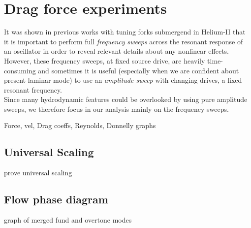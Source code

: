 \section{Drag force experiments}

It was shown in previous works \cite{svoc2016} \cite{fork-exp}  with tuning forks submergend in Helium-II that it is important to perform full \textit{frequency sweeps} across the resonant response of an oscillator in order to reveal relevant details about any nonlinear effects.\\
However, these frequency sweeps, at fixed source drive, are heavily time-consuming and sometimes it is useful (especially when we are confident about present laminar mode) to use an \textit{amplitude sweep} with changing drives, a fixed resonant frequency.\\
Since many hydrodynamic features could be overlooked by using pure amplitude sweeps, we therefore focus in our analysis mainly on the frequency sweeps.

\todo Force, vel, Drag coeffs, Reynolds, Donnelly graphs

\subsection*{Universal Scaling}

\todo prove universal scaling

\subsection*{Flow phase diagram}

\todo graph of merged fund and overtone modes

